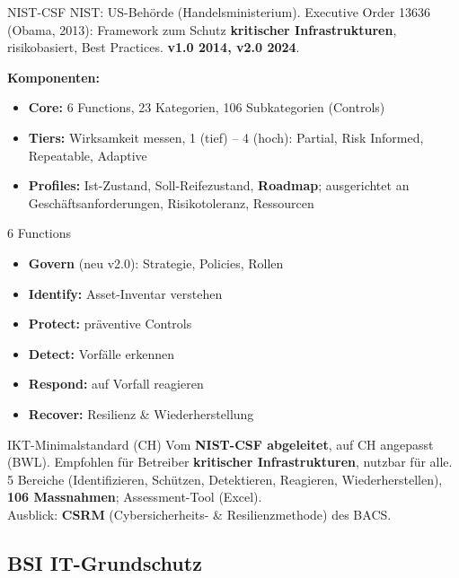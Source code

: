 \documentclass[a4paper, fontsize=7pt]{scrartcl}
\begin{document}
\begin{mainbox}{NIST-CSF}
NIST: US-Behörde (Handelsministerium). Executive Order 13636 (Obama, 2013):
Framework zum Schutz \textbf{kritischer Infrastrukturen}, risikobasiert,
Best Practices. \textbf{v1.0 2014, v2.0 2024}.

\textbf{Komponenten:}
\begin{itemize}
    \item \textbf{Core:} 6 Functions, 23 Kategorien, 106 Subkategorien (Controls)
    \item \textbf{Tiers:} Wirksamkeit messen, 1 (tief) -- 4 (hoch): Partial, Risk
          Informed, Repeatable, Adaptive
    \item \textbf{Profiles:} Ist-Zustand, Soll-Reifezustand, \textbf{Roadmap};
          ausgerichtet an Geschäftsanforderungen, Risikotoleranz, Ressourcen
\end{itemize}
\end{mainbox}

\begin{mainbox}{6 Functions}
\begin{itemize}
    \item \textbf{Govern} (neu v2.0): Strategie, Policies, Rollen
    \item \textbf{Identify:} Asset-Inventar verstehen
    \item \textbf{Protect:} präventive Controls
    \item \textbf{Detect:} Vorfälle erkennen
    \item \textbf{Respond:} auf Vorfall reagieren
    \item \textbf{Recover:} Resilienz \& Wiederherstellung
\end{itemize}
\end{mainbox}

\begin{mainbox}{IKT-Minimalstandard (CH)}
Vom \textbf{NIST-CSF abgeleitet}, auf CH angepasst (BWL). Empfohlen für
Betreiber \textbf{kritischer Infrastrukturen}, nutzbar für alle. 5 Bereiche
(Identifizieren, Schützen, Detektieren, Reagieren, Wiederherstellen),
\textbf{106 Massnahmen}; Assessment-Tool (Excel).\\
Ausblick: \textbf{CSRM} (Cybersicherheits- \& Resilienzmethode) des BACS.
\end{mainbox}

\subsection{BSI IT-Grundschutz}
\end{document}
